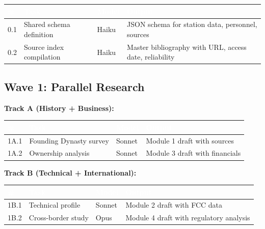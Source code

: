 \documentclass[11pt,letterpaper]{article}
\newcommand{\tableheader}[1]{\textbf{\sffamily\textcolor{white}{#1}}}
\begin{document}
\begin{center}
\begin{tabularx}{\textwidth}{C{0.6cm}L{3cm}C{1.5cm}X}
\toprule
{}
\tableheader{\#} & \tableheader{Task} & \tableheader{Model} & \tableheader{Output} \\
 & Shared schema definition & Haiku & JSON schema for station data, personnel, sources \\
0.2 & Source index compilation & Haiku & Master bibliography with URL, access date, reliability \\
\bottomrule
\end{tabularx}
\end{center}

\subsection{Wave 1: Parallel Research}

\textbf{Track A (History + Business):}

\begin{center}
\begin{tabularx}{\textwidth}{C{0.6cm}L{3cm}C{1.5cm}X}
\toprule
{}
\tableheader{\#} & \tableheader{Task} & \tableheader{Model} & \tableheader{Output} \\
\midrule
1A.1 & Founding Dynasty survey & Sonnet & Module 1 draft with sources \\
1A.2 & Ownership analysis & Sonnet & Module 3 draft with financials \\
\bottomrule
\end{tabularx}
\end{center}

\textbf{Track B (Technical + International):}

\begin{center}
\begin{tabularx}{\textwidth}{C{0.6cm}L{3cm}C{1.5cm}X}
\toprule
{}
\tableheader{\#} & \tableheader{Task} & \tableheader{Model} & \tableheader{Output} \\
\midrule
1B.1 & Technical profile & Sonnet & Module 2 draft with FCC data \\
1B.2 & Cross-border study & Opus & Module 4 draft with regulatory analysis \\
\bottomrule
\end{tabularx}
\end{center}
\end{document}
